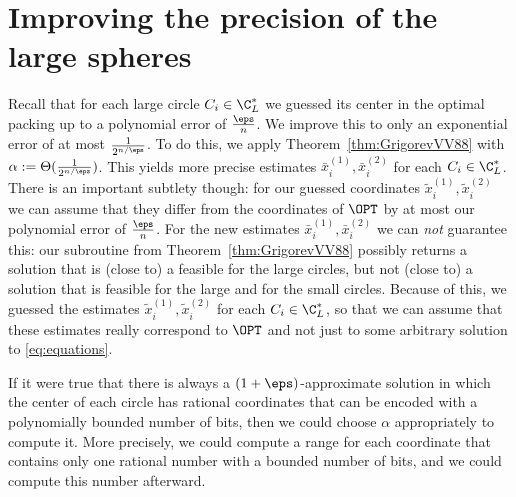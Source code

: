 


\section{Improving the precision of the large spheres}
\label{subsec:Improve_Large} Recall that for each large circle $C_{i}\in\C_{L}^{*}$
we guessed its center in the optimal packing up to a polynomial error
of $\frac{\eps}{n}$. We improve this to only an exponential error
of at most $\frac{1}{2^{n/\eps}}$. To do this, we apply Theorem~\ref{thm:GrigorevVV88}
with $\alpha:=\Theta(\frac{1}{2^{n/\eps}})$. This yields more precise
estimates $\bar{x}_{i}^{(1)},\bar{x}_{i}^{(2)}$ for each $C_{i}\in\C_{L}^{*}$.
There is an important subtlety though: for our guessed coordinates
$\tilde{x}_{i}^{(1)},\tilde{x}_{i}^{(2)}$ we can assume that they
differ from the coordinates of $\OPT$ by at most our polynomial error
of $\frac{\eps}{n}$. For the new estimates $\bar{x}_{i}^{(1)},\bar{x}_{i}^{(2)}$
we can \emph{not }guarantee this: our subroutine from Theorem~\ref{thm:GrigorevVV88}
possibly returns a solution that is (close to) a feasible for the
large circles, but not (close to) a solution that is feasible for
the large and for the small circles. Because of this, we guessed the estimates
$\tilde{x}_{i}^{(1)},\tilde{x}_{i}^{(2)}$ for each $C_{i}\in\C_{L}^{*}$,
so that we can assume that these estimates really correspond to $\OPT$
and not just to some arbitrary solution to \eqref{eq:equations}.

If it were true that there is always a $(1+\eps)$-approximate solution
in which the center of each circle has rational coordinates that can
be encoded with a polynomially bounded number of bits, then we could
choose $\alpha$ appropriately to compute it. More precisely, we could
compute a range for each coordinate that contains only one rational
number with a bounded number of bits, and we could compute this number
afterward.




